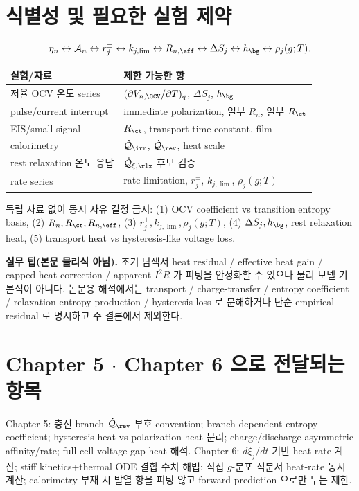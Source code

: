 \section{식별성 및 필요한 실험 제약}\label{sec:ch4_ident}
\begin{equation}
\eta_n\leftrightarrow\mathcal A_n\leftrightarrow r_j^\pm\leftrightarrow k_{j,\lim}\leftrightarrow R_{n,\eff}\leftrightarrow\Delta S_j\leftrightarrow h_\bg\leftrightarrow\rho_j(g;T).
\label{eq:ch4_ident}
\end{equation}
\begin{longtable}{p{} p{}}
\toprule 실험/자료 & 제한 가능한 항 \\ \midrule \endhead
저율 OCV 온도 series & $(\partial V_{n,\OCV}/\partial T)_q$, $\Delta S_j$, $h_\bg$ \\
pulse/current interrupt & immediate polarization, 일부 $R_n$, 일부 $R_{\ct}$ \\
EIS/small-signal & $R_{\ct}$, transport time constant, film \\
calorimetry & $\dot{\mathcal Q}_{\irr}$, $\dot{\mathcal Q}_{\rev}$, heat scale \\
rest relaxation 온도 응답 & $\dot{\mathcal Q}_{\xi,\rlx}$ 후보 검증 \\
rate series & rate limitation, $r_j^\pm$, $k_{j,\lim}$, $\rho_j(g;T)$ \\
\bottomrule
\end{longtable}
독립 자료 없이 동시 자유 결정 금지: (1) OCV coefficient vs transition entropy basis, (2) $R_n,R_{\ct},R_{n,\eff}$,
(3) $r_j^\pm,k_{j,\lim},\rho_j(g;T)$, (4) $\Delta S_j,h_\bg$, rest relaxation heat, (5) transport heat vs
hysteresis-like voltage loss.

\begin{mdframed}
\textbf{실무 팁(본문 물리식 아님).} 초기 탐색서 heat residual / effective heat gain / capped heat correction /
apparent $I^2R$ 가 피팅을 안정화할 수 있으나 물리 모델 기본식이 아니다. 논문용 해석에서는 transport /
charge-transfer / entropy coefficient / relaxation entropy production / hysteresis loss 로 분해하거나 단순
empirical residual 로 명시하고 주 결론에서 제외한다.
\end{mdframed}

\section{Chapter 5 $\cdot$ Chapter 6 으로 전달되는 항목}\label{sec:ch4_transmit}
Chapter 5: 충전 branch $\dot{\mathcal Q}_{\rev}$ 부호 convention; branch-dependent entropy coefficient;
hysteresis heat vs polarization heat 분리; charge/discharge asymmetric affinity/rate; full-cell voltage gap
heat 해석. Chapter 6: $d\xi_j/dt$ 기반 heat-rate 계산; stiff kinetics+thermal ODE 결합 수치 해법; 직접
$g$-분포 적분서 heat-rate 동시 계산; calorimetry 부재 시 발열 항을 피팅 않고 forward prediction 으로만 두는 제한.

